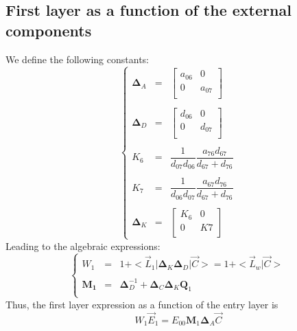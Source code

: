 \documentclass[aps,onecolumn,11pt]{revtex4}
\newcommand{\mymat}[1]{{\bm{#1}}}
\begin{document}
\subsection{First layer as a function of the external components}
We define the following constants:
\begin{equation}
\left\lbrace
\begin{array}{rcl}
\mymat{\Delta}_A &= &\begin{bmatrix}
a_{06} & 0 \\
0 & a_{07} \\
\end{bmatrix}\\
\\
\mymat{\Delta}_D & = & 
\begin{bmatrix}
d_{06} & 0 \\
0 & d_{07} \\
\end{bmatrix} \\
\\
K_6 & = & \dfrac{1}{d_{07}d_{06}}  \dfrac{a_{76}d_{67}}{d_{67}+d_{76}} \\
\\
K_7 & = &  \dfrac{1}{d_{06}d_{07}} \dfrac{a_{67}d_{76}}{d_{67}+d_{76}} \\
\\
\mymat{\Delta}_K & = & \begin{bmatrix} K_6 & 0 \\ 0 & K7 \\ \end{bmatrix}
\end{array}
\right.
\end{equation}
Leading to the algebraic expressions:
\begin{equation}
\left\lbrace
\begin{array}{rcl}
W_1 & = & 1 +  <\vec{L}_1| \mymat{\Delta}_K \mymat{\Delta}_D | \vec{C}> = 1+ <\vec{L}_w|\vec{C}> \\
\\
\mymat{M_1} & = & \mymat{\Delta}_D^{-1} + \mymat{\Delta}_C \mymat{\Delta}_K \mymat{Q}_1 \\
\end{array}
\right.
\end{equation}
Thus, the first layer expression as a function of the entry layer is
\begin{equation}
\boxed
{
W_1 \vec{E}_1  =  E_{00} \mymat{M}_1  \mymat{\Delta}_A \vec{C}
}
\end{equation}
\end{document}
